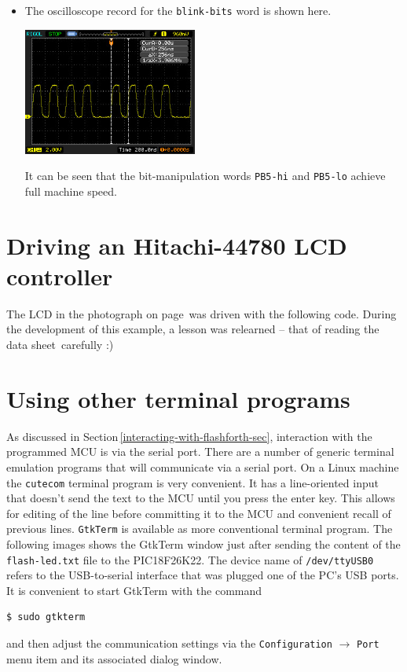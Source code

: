 \documentclass[12pt,a4paper]{article}
\newcommand{\code}[2]{
 \hrulefill
 \scriptsize
 
 \hrulefill
 \vspace{2em}
 \normalsize
}
\begin{document}
\begin{itemize}
 \item The oscilloscope record for the \verb!blink-bits! word is shown here.
  \begin{center}
  \includegraphics[width=0.45\textwidth]{../figs/speed-test-named-bits-inlined-atmega328-2016.jpeg}
  \end{center}
  It can be seen that the bit-manipulation words \verb!PB5-hi! and \verb!PB5-lo! achieve full machine speed.
\end{itemize}


\newpage
\section{Driving an Hitachi-44780 LCD controller}
\label{lcd-example-sec}
%
The LCD in the photograph on page\,\pageref{lcd-on-picdem2-board} was driven with the following code.
During the development of this example, a lesson was relearned -- that of reading 
the data sheet\,\cite{hitachi-hd44780-datasheet} carefully :)

\bigskip\noindent
\code{}{../pic18/xlcd.txt}

\newpage



\appendix
\newpage
\section{Using other terminal programs}
\label{other-terminal-programs-sec}
%
As discussed in Section\,\ref{interacting-with-flashforth-sec},
interaction with the programmed MCU is via the serial port.
There are a number of generic terminal emulation programs that will
communicate via a serial port.
On a Linux machine the \texttt{cutecom} terminal program is very convenient.
It has a line-oriented input that doesn't send the text to the MCU until
you press the enter key.
This allows for editing of the line before committing it to the MCU and
convenient recall of previous lines.
\texttt{GtkTerm} is available as more conventional terminal program.
The following images shows the GtkTerm window just after sending the content
of the \verb!flash-led.txt! file to the PIC18F26K22.
The device name of \verb!/dev/ttyUSB0! refers to the USB-to-serial interface 
that was plugged one of the PC's USB ports.
It is convenient to start GtkTerm with the command
\begin{verbatim}
$ sudo gtkterm 
\end{verbatim}
and then adjust the communication settings via the \verb!Configuration! $\rightarrow$ \verb!Port! menu item 
and its associated dialog window.
\end{document}
